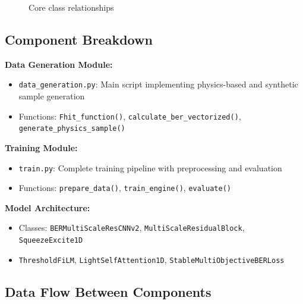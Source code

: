 \documentclass[a4paper,12pt]{report}
\begin{document}
\begin{figure}[h!]
\caption{Core class relationships}
\label{fig:classes}
\end{figure}

\subsection{Component Breakdown}

\textbf{Data Generation Module:}
\begin{itemize}
    \item \texttt{data\_generation.py}: Main script implementing physics-based and synthetic sample generation
    \item Functions: \texttt{Fhit\_function()}, \texttt{calculate\_ber\_vectorized()}, \texttt{generate\_physics\_sample()}
\end{itemize}

\textbf{Training Module:}
\begin{itemize}
    \item \texttt{train.py}: Complete training pipeline with preprocessing and evaluation
    \item Functions: \texttt{prepare\_data()}, \texttt{train\_engine()}, \texttt{evaluate()}
\end{itemize}

\textbf{Model Architecture:}
\begin{itemize}
    \item Classes: \texttt{BERMultiScaleResCNNv2}, \texttt{MultiScaleResidualBlock}, \texttt{SqueezeExcite1D}
    \item \texttt{ThresholdFiLM}, \texttt{LightSelfAttention1D}, \texttt{StableMultiObjectiveBERLoss}
\end{itemize}

\subsection{Data Flow Between Components}
\end{document}
